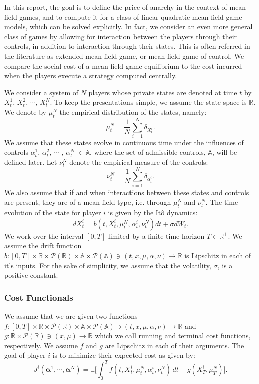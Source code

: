 \documentclass[11pt]{article}
\def\balpha{\boldsymbol{\alpha}}
\newcommand\cP{\mathcal P}
\newcommand\EE{\mathbb E}
\begin{document}
In this report, the goal is to define the price of anarchy in the context of mean field games, and to compute it for a class of linear quadratic mean field game models, which can be solved explicitly. In fact, we consider an even more general class of games by allowing for interaction between the players through their controls, in addition to interaction through their states. This is often referred in the literature as extended mean field game, or mean field game of control. We compare the social cost of a mean field game equilibrium to the cost incurred when the players execute a strategy computed centrally.

We consider a system of $N$ players whose private states are denoted at time $t$ by $X^1_t$, $X^2_t$, $\cdots$, $X^N_t$. To keep the presentations simple, we assume the state space is $\mathbb{R}$. We denote by $\mu^N_t$ the empirical distribution of the states, namely:
\begin{equation*}
\mu^N_t=\frac1N\sum_{i=1}^N\delta_{X^i_t}.
\end{equation*}
We assume that these states evolve in continuous time under the influences of controls  $\alpha^1_t$, $\alpha^2_t$, $\cdots$ , $\alpha^N_t$ $\in \mathbb{A}$, where the set of admissible controls, $\mathbb{A}$, will be defined later. Let $\nu^N_{t}$ denote the empirical measure of the controls:
\begin{equation*}
\nu^N_t=\frac1N\sum_{i=1}^N\delta_{\alpha^i_t}.
\end{equation*}
We also assume that if and when interactions between these states and controls are present, they are of a mean field type, i.e. through $\mu^N_t$ and $\nu^N_t$. The time evolution of the state for player $i$ is given by the It\^{o} dynamics:
\begin{equation*}
    dX^i_t=b(t,X^i_t,\mu^N_t,\alpha^i_t,\nu^N_t)dt+\sigma dW_t.
\end{equation*}
We work over the interval $[0,T]$ limited by a finite time horizon $T \in \mathbb{R}^+$. We assume the drift function $b:[0,T] \times \mathbb{R} \times \cP(\mathbb{R}) \times \mathbb{A} \times \cP(\mathbb{A}) \ni (t,x,\mu,\alpha,\nu)  \rightarrow \mathbb{R}$ is Lipschitz in each of it's inputs. For the sake of simplicity, we assume that the volatility, $\sigma$, is a positive constant.

\subsubsection*{\textbf{Cost Functionals}}
We assume that we are given two functions $f:[0,T] \times \mathbb{R} \times \cP(\mathbb{R}) \times \mathbb{A} \times \cP(\mathbb{A}) \ni (t,x,\mu,\alpha, \nu) \rightarrow \mathbb{R}$ and $g:\mathbb{R}\times \cP(\mathbb{R}) \ni (x,\mu) \rightarrow \mathbb{R}$ which we call running and terminal cost functions, respectively. We assume $f$ and $g$ are Lipschitz in each of their arguments. The goal of player $i$ is to minimize their expected cost as given by:
\begin{equation*}
J^i(\balpha^1,\cdots,\balpha^N)=\EE\bigg[\int_0^Tf(t,X^i_t,\mu^N_{t},\alpha^i_t,\nu^N_{t})\,dt +g(X^i_T,\mu^{N}_{T})\bigg].
\end{equation*}
\end{document}
